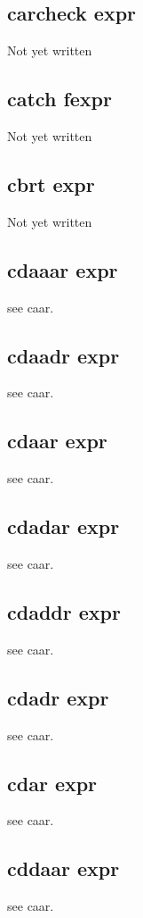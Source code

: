 \documentclass[a4paper,11pt]{article}
\begin{document}
{\subsection{\ttfamily carcheck expr}
Not yet written

\subsection{\ttfamily catch fexpr}
Not yet written

\subsection{\ttfamily cbrt expr}
Not yet written

\subsection{\ttfamily cdaaar expr}
see {\ttfamily caar}.

\subsection{\ttfamily cdaadr expr}
see {\ttfamily caar}.

\subsection{\ttfamily cdaar expr}
see {\ttfamily caar}.

\subsection{\ttfamily cdadar expr}
see {\ttfamily caar}.

\subsection{\ttfamily cdaddr expr}
see {\ttfamily caar}.

\subsection{\ttfamily cdadr expr}
see {\ttfamily caar}.

\subsection{\ttfamily cdar expr}
see {\ttfamily caar}.

\subsection{\ttfamily cddaar expr}
see {\ttfamily caar}.

}
\end{document}

